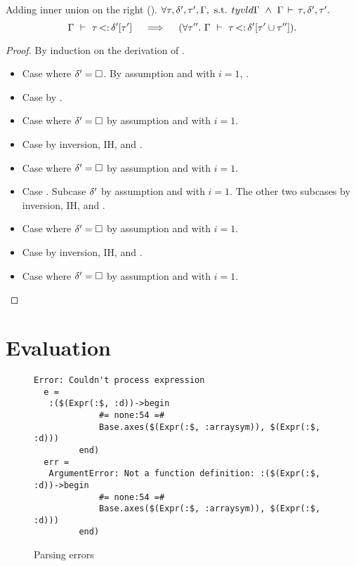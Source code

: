 \begin{lemma}{Adding inner union on the right (\textbf{\lemref{}}).}%
\label{lem:add-inner-union-right:app}
    $\forall \tau, \delta', \tau', \Gamma, \text{ s.t. }
    tyvld{}{\Gamma}\ \land\ \Gamma\,\vdash\,\tau, \delta', \tau'.$
    \[
        \subtydflt{\ty}{\plug{\dctx'}{\ty'}}
        \quad\implies\quad
        (\forall \ty''.\ \subtydflt{\ty}{\plug{\dctx'}{\tyunion{\ty'}{\ty''}}}).
    \]
\end{lemma}
\begin{proof}
    By induction on the derivation of
    .
    \begin{itemize}
        \item Case  where $\delta'=\square$. By assumption
            \subtydflt{\ty}{\tyany} and  with $i=1$,
            .
        \item Case  by .
        \item Case  where $\delta'=\square$
            by assumption and  with $i=1$.
        \item Case  by inversion, IH, and .
        \item Case  where $\delta'=\square$
            by assumption and  with $i=1$.
        \item Case . 
            Subcase $\delta'$ by assumption and  with $i=1$.
            The other two subcases by inversion, IH, and .
        \item Case  where $\delta'=\square$
            by assumption and  with $i=1$.
        \item Case  by inversion, IH, and .
        \item Case  where $\delta'=\square$
            by assumption and  with $i=1$.
    \end{itemize}
\end{proof}


\section{Evaluation}\label{sec:app:eval}

\begin{figure}
\begin{lstlisting}
Error: Couldn't process expression
  e =
   :($(Expr(:$, :d))->begin
             #= none:54 =#
             Base.axes($(Expr(:$, :arraysym)), $(Expr(:$, :d)))
         end)
  err =
   ArgumentError: Not a function definition: :($(Expr(:$, :d))->begin
             #= none:54 =#
             Base.axes($(Expr(:$, :arraysym)), $(Expr(:$, :d)))
         end)
\end{lstlisting}
\caption{Parsing errors}\label{fig:evaluation-parse-errors}
\end{figure}

